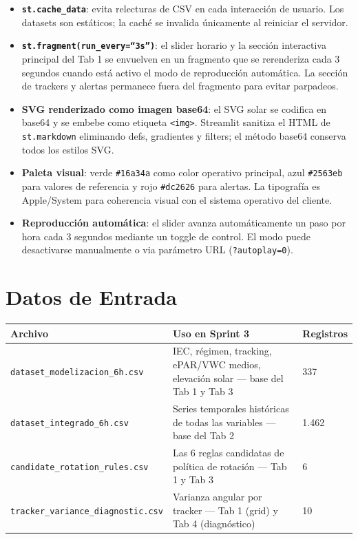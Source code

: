 \documentclass[11pt,a4paper]{article}
\begin{document}
\begin{itemize}
  \item \textbf{\texttt{st.cache\_data}}: evita relecturas de CSV en cada interacción de usuario.
    Los datasets son estáticos; la caché se invalida únicamente al reiniciar el servidor.
  \item \textbf{\texttt{st.fragment(run\_every=``3s'')}}: el slider horario y la sección interactiva
    principal del Tab 1 se envuelven en un fragmento que se rerenderiza cada 3 segundos
    cuando está activo el modo de reproducción automática. La sección de trackers y alertas
    permanece fuera del fragmento para evitar parpadeos.
  \item \textbf{SVG renderizado como imagen base64}: el SVG solar se codifica en base64 y se
    embebe como etiqueta \texttt{<img>}. Streamlit sanitiza el HTML de \texttt{st.markdown} eliminando
    defs, gradientes y filters; el método base64 conserva todos los estilos SVG.
  \item \textbf{Paleta visual}: verde \texttt{\#16a34a} como color operativo principal, azul
    \texttt{\#2563eb} para valores de referencia y rojo \texttt{\#dc2626} para alertas. La tipografía
    es Apple/System para coherencia visual con el sistema operativo del cliente.
  \item \textbf{Reproducción automática}: el slider avanza automáticamente un paso por hora
    cada 3 segundos mediante un toggle de control. El modo puede desactivarse manualmente
    o via parámetro URL (\texttt{?autoplay=0}).
\end{itemize}

\section{Datos de Entrada}

\begin{longtable}{p{} p{} p{}}
\toprule
\textbf{Archivo} & \textbf{Uso en Sprint 3} & \textbf{Registros} \\
\midrule
\texttt{dataset\_modelizacion\_6h.csv} & IEC, régimen, tracking, ePAR/VWC medios, elevación solar — base del Tab 1 y Tab 3 & 337 \\
\texttt{dataset\_integrado\_6h.csv} & Series temporales históricas de todas las variables — base del Tab 2 & 1.462 \\
\texttt{candidate\_rotation\_rules.csv} & Las 6 reglas candidatas de política de rotación — Tab 1 y Tab 3 & 6 \\
\texttt{tracker\_variance\_diagnostic.csv} & Varianza angular por tracker — Tab 1 (grid) y Tab 4 (diagnóstico) & 10 \\
\bottomrule
\end{longtable}
\end{document}
